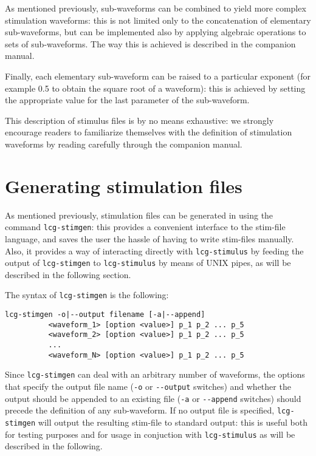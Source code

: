 As mentioned previously, sub-waveforms can be combined to yield more
complex stimulation waveforms: this is not limited only to the
concatenation of elementary sub-waveforms, but can be implemented also
by applying algebraic operations to sets of sub-waveforms. The way
this is achieved is described in the companion manual.

Finally, each elementary sub-waveform can be raised to a particular
exponent (for example 0.5 to obtain the square root of a waveform):
this is achieved by setting the appropriate value for the last
parameter of the sub-waveform.

This description of stimulus files is by no means exhaustive: we
strongly encourage readers to familiarize themselves with the
definition of stimulation waveforms by reading carefully through the
companion manual.

\section{Generating stimulation files}
As mentioned previously, stimulation files can be generated in
\progname using the command \verb+lcg-stimgen+: this provides a
convenient interface to the stim-file language, and saves the user the
hassle of having to write stim-files manually. Also, it provides a way
of interacting directly with \verb+lcg-stimulus+ by feeding the output
of \verb+lcg-stimgen+ to \verb+lcg-stimulus+ by means of UNIX pipes,
as will be described in the following section.

The syntax of \verb+lcg-stimgen+ is the following:
\begin{verbatim}
lcg-stimgen -o|--output filename [-a|--append] 
          <waveform_1> [option <value>] p_1 p_2 ... p_5
          <waveform_2> [option <value>] p_1 p_2 ... p_5
          ...
          <waveform_N> [option <value>] p_1 p_2 ... p_5
\end{verbatim}
Since \verb+lcg-stimgen+ can deal with an arbitrary number of
waveforms, the options that specify the output file name (\verb+-o+ or
\verb+--output+ switches) and whether the output should be appended to
an existing file (\verb+-a+ or \verb+--append+ switches) should
precede the definition of any sub-waveform. If no output file is
specified, \verb+lcg-stimgen+ will output the resulting stim-file to
standard output: this is useful both for testing purposes and for
usage in conjuction with \verb+lcg-stimulus+ as will be described in
the following.

